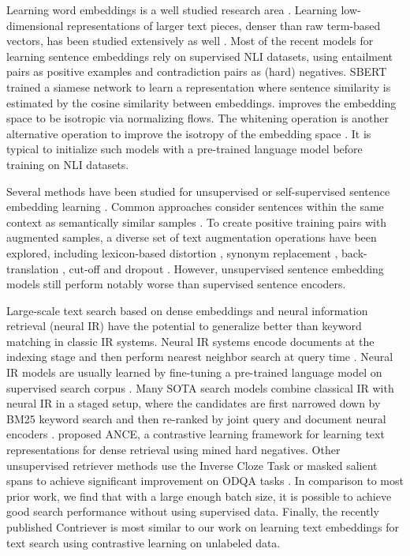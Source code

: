 \documentclass[nohyperref]{article}
\begin{document}
Learning word embeddings is a well studied research area \cite{brown,Gutmann,mikolov,pennington}. Learning low-dimensional representations of larger text pieces, denser than raw term-based vectors, has been studied extensively as well \cite{deerwester,contrastive}. Most of the recent models for learning sentence embeddings rely on supervised NLI datasets, using entailment pairs as positive examples and contradiction pairs as (hard) negatives. SBERT \cite{sbert} trained a siamese network to learn a representation where sentence similarity is estimated by the cosine similarity between embeddings. \citet{Li} improves the embedding space to be isotropic via normalizing flows. The whitening operation is another alternative operation to improve the isotropy of the embedding space \cite{Su}. It is typical to initialize such models with a pre-trained language model \cite{bert} before training on NLI datasets.

Several methods have been studied for unsupervised or self-supervised sentence embedding learning \cite{Logeswaran,Zhang,simcse}. Common approaches consider sentences within the same context as semantically similar samples \cite{Kiros,Logeswaran}. To create positive training pairs with augmented samples, a diverse set of text augmentation operations have been explored, including lexicon-based distortion \cite{Wei}, synonym replacement \cite{Kobayashi}, back-translation \cite{Fang}, cut-off \cite{Shen} and dropout \cite{simcse}. However, unsupervised sentence embedding models still perform notably worse than supervised sentence encoders.

Large-scale text search based on dense embeddings and neural information retrieval (neural IR) have the potential to generalize better than keyword matching in classic IR systems. Neural IR systems encode documents at the indexing stage and then perform nearest neighbor search \cite{Johnson} at query time \cite{Lin}. Neural IR models are usually learned by fine-tuning a pre-trained language model on supervised search corpus \cite{ORQA,REALM,Karpukhin,Lewis}. Many SOTA search models combine classical IR with neural IR in a staged setup, where the candidates are first narrowed down by BM25 keyword search \cite{bm25} and then re-ranked by joint query and document neural encoders \cite{Nogueira,Qu}. \citet{Xiong} proposed ANCE, a contrastive learning framework for learning text representations for dense retrieval using mined hard negatives.  Other unsupervised retriever methods use the Inverse Cloze Task or masked salient spans to achieve significant improvement on ODQA tasks \cite{e2e}. In comparison to most prior work, we find that with a large enough batch size, it is possible to achieve good search performance without using supervised data. Finally, the recently published Contriever \cite{contreiver} is most similar to our work on learning text embeddings for text search using contrastive learning on unlabeled data.  
\end{document}
